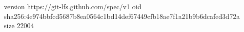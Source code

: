 version https://git-lfs.github.com/spec/v1
oid sha256:4e974bbfcd5687b8ea0564c1bd14def67449cfb18ae7f1a21b9b6dcafed3d72a
size 22004
